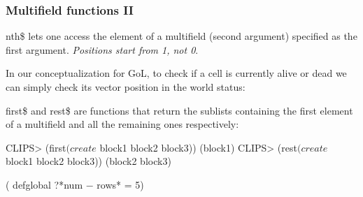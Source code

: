 \documentclass[xcolor={usenames,dvipsnames,svgnames}, compress]{beamer}
\begin{document}

\begin{frame}[fragile]
  \frametitle{Multifield functions II}
  \textsf{nth\$} lets one access the element of a multifield (second
  argument) specified as the first argument. 
  \emph{Positions start from 1, not 0}.\par
    In our conceptualization for GoL, to check if a cell is currently
    alive or dead we can simply check its vector position in the world status:
    \bigskip

    \textsf{first\$} and \textsf{rest\$} are functions that return the
    sublists containing the first element of a multifield and all the
    remaining ones respectively:
    \begin{clips-code}
      CLIPS> (first$ (create$ block1 block2 block3))
      (block1)
      CLIPS> (rest$ (create$ block1 block2 block3))
      (block2 block3)
    \end{clips-code}( defglobal ?*num − rows* = 5)
\end{frame}
\end{document}
